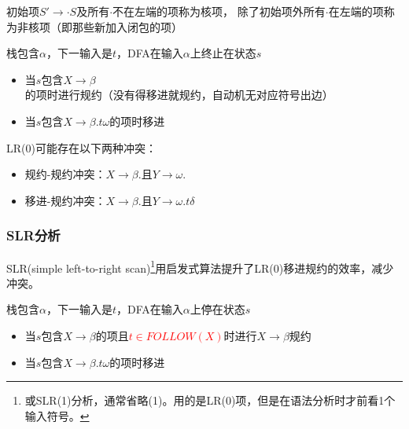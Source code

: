 \begin{definition}
初始项$S'\to\cdot S$及所有$\cdot$不在左端的项称为核项，
除了初始项外所有$\cdot$在左端的项称为非核项（即那些新加入闭包的项）
\end{definition}

\begin{definition}[LR(0)语法]
栈包含$\alpha$，下一输入是$t$，DFA在输入$\alpha$上终止在状态$s$
\begin{itemize}
	\item 当$s$包含$X\to\beta$的项时进行规约（没有得移进就规约，自动机无对应符号出边）
	\item 当$s$包含$X\to\beta.t\omega$的项时移进
\end{itemize}
\end{definition}

LR(0)可能存在以下两种冲突：
\begin{itemize}
	\item 规约-规约冲突：$X\to\beta.$且$Y\to\omega.$
	\item 移进-规约冲突：$X\to\beta.$且$Y\to\omega.t\delta$
\end{itemize}

\subsubsection{SLR分析}
SLR(simple left-to-right scan)\footnote{或SLR(1)分析，通常省略(1)。用的是LR(0)项，但是在语法分析时才前看1个输入符号。}用启发式算法提升了LR(0)移进规约的效率，减少冲突。
\begin{definition}[SLR(1)语法]
栈包含$\alpha$，下一输入是$t$，DFA在输入$\alpha$上停在状态$s$
\begin{itemize}
	\item 当$s$包含$X\to\beta$的项且\textcolor{red}{$t\in FOLLOW(X)$}时进行$X\to\beta$规约
	\item 当$s$包含$X\to\beta.t\omega$的项时移进
\end{itemize}
\end{definition}

